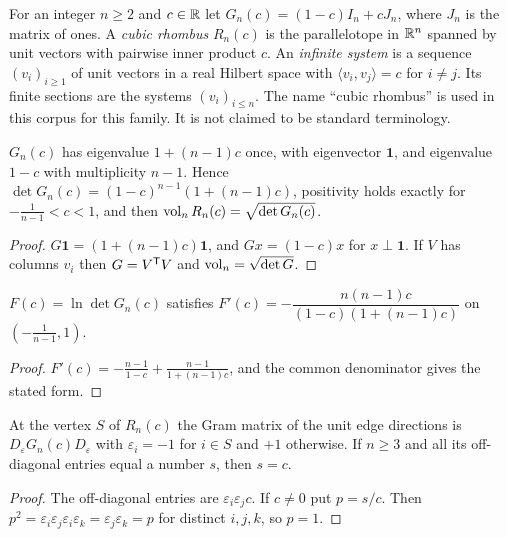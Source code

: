 \begin{definition}
For an integer $n\ge2$ and $c\in\mathbb{R}$ let $G_n(c)=(1-c)I_n+cJ_n$, where $J_n$ is the matrix of ones.
A \emph{cubic rhombus} $R_n(c)$ is the parallelotope in $\mathbb{R}^n$ spanned by unit vectors with pairwise inner product $c$.
An \emph{infinite system} is a sequence $(v_i)_{i\ge1}$ of unit vectors in a real Hilbert space with $\langle v_i,v_j\rangle=c$ for $i\ne j$.
Its finite sections are the systems $(v_i)_{i\le n}$.
The name ``cubic rhombus'' is used in this corpus for this family. It is not claimed to be standard terminology.
\end{definition}

\begin{lemma}\label{lem:spec}
$G_n(c)$ has eigenvalue $1+(n-1)c$ once, with eigenvector $\mathbf 1$, and eigenvalue $1-c$ with multiplicity $n-1$.
Hence $\det G_n(c)=(1-c)^{n-1}(1+(n-1)c)$, positivity holds exactly for $-\tfrac1{n-1}<c<1$, and then $\operatorname{vol}_nR_n(c)=\sqrt{\det G_n(c)}$.
\end{lemma}
\begin{proof}
$G\mathbf 1=(1+(n-1)c)\mathbf 1$, and $Gx=(1-c)x$ for $x\perp\mathbf 1$. If $V$ has columns $v_i$ then $G=V^{\mathsf{T}} V$ and $\operatorname{vol}_n=\sqrt{\det G}$.
\end{proof}

\begin{lemma}\label{lem:dlog}
$F(c)=\ln\det G_n(c)$ satisfies $F'(c)=-\dfrac{n(n-1)c}{(1-c)(1+(n-1)c)}$ on $(-\tfrac1{n-1},1)$.
\end{lemma}
\begin{proof}
$F'(c)=-\frac{n-1}{1-c}+\frac{n-1}{1+(n-1)c}$, and the common denominator gives the stated form.
\end{proof}

\begin{lemma}\label{lem:vertex}
At the vertex $S$ of $R_n(c)$ the Gram matrix of the unit edge directions is $D_\varepsilon G_n(c)D_\varepsilon$ with $\varepsilon_i=-1$ for $i\in S$ and $+1$ otherwise. If $n\ge3$ and all its off-diagonal entries equal a number $s$, then $s=c$.
\end{lemma}
\begin{proof}
The off-diagonal entries are $\varepsilon_i\varepsilon_jc$. If $c\ne0$ put $p=s/c$. Then $p^2=\varepsilon_i\varepsilon_j\varepsilon_i\varepsilon_k=\varepsilon_j\varepsilon_k=p$ for distinct $i,j,k$, so $p=1$.
\end{proof}
